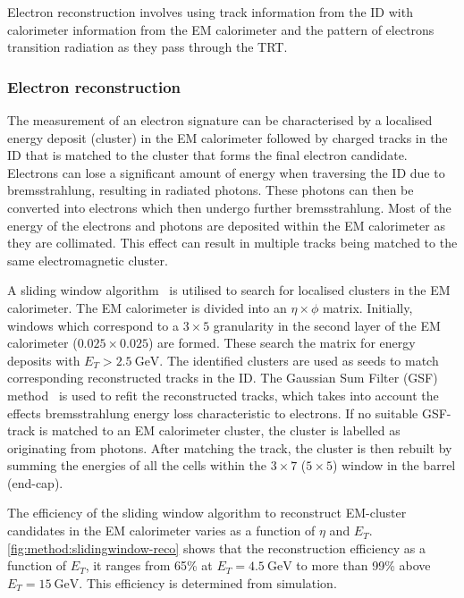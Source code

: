 Electron reconstruction involves using track information from the ID with calorimeter information from the EM calorimeter and the pattern of electrons transition radiation as they pass through the TRT.

\subsubsection{Electron reconstruction}
The measurement of an electron signature can be characterised by a localised energy deposit (cluster) in the EM calorimeter followed by charged tracks in the ID that is matched to the cluster that forms the final electron candidate. Electrons can lose a significant amount of energy when traversing the ID due to bremsstrahlung, resulting in radiated photons. These photons can then be converted into electrons which then undergo further bremsstrahlung. Most of the energy of the electrons and photons are deposited within the EM calorimeter as they are collimated. This effect can result in multiple tracks being matched to the same electromagnetic cluster. 

A sliding window algorithm~\cite{slidingwindow} is utilised to search for localised clusters in the EM calorimeter. The EM calorimeter is divided into an $\eta \times \phi$ matrix. Initially, windows which correspond to a $3 \times 5$ granularity in the second layer of the EM calorimeter ($0.025 \times 0.025$) are formed. These search the matrix for energy deposits with $E_T > \SI{2.5}{\giga\electronvolt}$. The identified clusters are used as seeds to match corresponding reconstructed tracks in the ID. The Gaussian Sum Filter (GSF) method~\cite{ATLAS:CONF-2012-047} is used to refit the reconstructed tracks, which takes into account the effects bremsstrahlung energy loss characteristic to electrons. If no suitable GSF-track is matched to an EM calorimeter cluster, the cluster is labelled as originating from photons.  After matching the track, the cluster is then rebuilt by summing the energies of all the cells within the $3 \times 7$ ($5 \times 5$) window in the barrel (end-cap).

The efficiency of the sliding window algorithm to reconstruct EM-cluster candidates in the EM calorimeter varies as a function of $\eta$ and $E_T$. \cref{fig:method:slidingwindow-reco} shows that the reconstruction efficiency as a function of $E_T$, it ranges from 65\% at $E_T = \SI{4.5}{\giga\electronvolt}$ to more than 99\% above $E_T = \SI{15}{\giga\electronvolt}$. This efficiency is determined from simulation.


